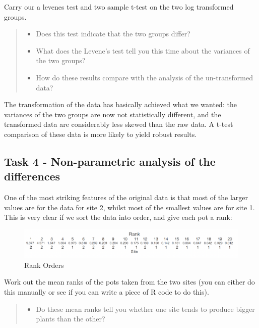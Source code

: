 \documentclass[
]{book}
\providecommand{\tightlist}{%
  \setlength{\itemsep}{0pt}\setlength{\parskip}{0pt}}
\begin{document}
Carry our a levenes test and two sample t-test on the two log transformed groups.

\begin{quote}
\begin{itemize}
\tightlist
\item
  Does this test indicate that the two groups differ?
\item
  What does the Levene's test tell you this time about the variances of the two groups?
\item
  How do these results compare with the analysis of the un-transformed data?
\end{itemize}
\end{quote}

The transformation of the data has basically achieved what we wanted: the variances of the two groups are now not statistically different, and the transformed data are considerably less skewed than the raw data. A t-test comparison of these data is more likely to yield robust results.

\hypertarget{task-4---non-parametric-analysis-of-the-differences}{%
\subsection{Task 4 - Non-parametric analysis of the differences}\label{task-4---non-parametric-analysis-of-the-differences}}

One of the most striking features of the original data is that most of the larger values are for the data for site 2, whilst most of the smallest values are for site 1. This is very clear if we sort the data into order, and give each pot a rank:

\begin{figure}
\includegraphics[width=0.9\linewidth]{figures/ranks} \caption{Rank Orders}\label{fig:unnamed-chunk-73}
\end{figure}

Work out the mean ranks of the pots taken from the two sites (you can either do this manually or see if you can write a piece of R code to do this).

\begin{quote}
\begin{itemize}
\tightlist
\item
  Do these mean ranks tell you whether one site tends to produce bigger plants than the other?
\end{itemize}
\end{quote}
\end{document}

